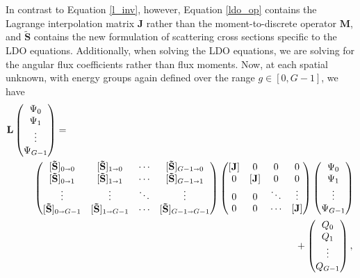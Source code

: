 \documentclass{article} %
\newcommand{\sa}{\shortrightarrow}
\newcommand{\ve}[1]{\ensuremath{\mathbf{#1}}}
\newcommand{\fq}{\qquad\qquad\qquad\qquad}
\newcommand{\st}{\tilde{S}}
\begin{document}
In contrast to Equation \eqref{l_inv}, however, Equation \eqref{ldo_op} contains
the Lagrange interpolation matrix $\ve{J}$ rather than the moment-to-discrete
operator $\ve{M}$, and $\ve{\tilde{S}}$ contains the new formulation of
scattering cross sections specific to the LDO equations. Additionally, when
solving the LDO equations, we are solving for the angular flux coefficients
rather than flux moments. Now, at each spatial unknown, with energy groups 
again defined over the range $g\in[0,G-1]$, we have
%
\begin{align}
    \ve{L}
    &\begin{pmatrix}
      \Psi_0 \\
      \Psi_1 \\
      \vdots   \\
      \Psi_{G-1}  \nonumber
    \end{pmatrix} = \\
    &\qquad\begin{pmatrix}
      [\ve{\st}]_{0\sa 0}   & [\ve{\st}]_{1\sa0}    & \cdots & [\ve{\st}]_{G-1\sa0} \\
      [\ve{\st}]_{0\sa 1}   & [\ve{\st}]_{1\sa1}    & \cdots & [\ve{\st}]_{G-1\sa1} \\
      \vdots                & \vdots                & \ddots & \vdots               \\
      [\ve{\st}]_{0\sa G-1} & [\ve{\st}]_{1\sa G-1} & \cdots & [\ve{\st}]_{G-1 \sa G-1}
    \end{pmatrix}
    \begin{pmatrix}
      [\ve{J}] & 0 & 0 & 0 \\
      0 & [\ve{J}] & 0 & 0 \\
      0 & 0 & \ddots & \vdots \\
      0 & 0 & \cdots & [\ve{J}] \\
    \end{pmatrix}
    \begin{pmatrix}
      \Psi_0 \\
      \Psi_1 \\
      \vdots   \\
      \Psi_{G-1}
    \end{pmatrix}
    \\&\fq\fq\fq\qquad\qquad\quad+
    \begin{pmatrix}
      Q_0 \\
      Q_1 \\
      \vdots  \\
      Q_{G-1} \nonumber
    \end{pmatrix},
\end{align}
\end{document}
